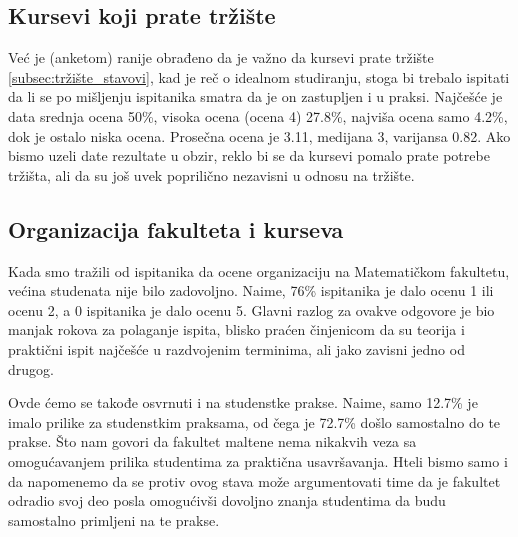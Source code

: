 \documentclass[a4paper]{article}
\begin{document}
{\subsection{Kursevi koji prate tržište}
\label{subsec:tržište_iskustva}

Već je (anketom) ranije obrađeno da je važno da kursevi prate tržište \ref{subsec:tržište_stavovi}, kad je reč o idealnom studiranju, stoga bi trebalo ispitati da li se po mišljenju ispitanika smatra da je on zastupljen i u praksi. Najčešće je data srednja ocena 50\%, visoka ocena (ocena 4) 27.8\%, najviša ocena samo 4.2\%, dok je ostalo niska ocena. Prosečna ocena je 3.11, medijana 3, varijansa 0.82. Ako bismo uzeli date rezultate u obzir, reklo bi se da kursevi pomalo prate potrebe tržišta, ali da su još uvek poprilično nezavisni u odnosu na tržište.

\subsection{Organizacija fakulteta i kurseva}
\label{subsec:organizacija_iskustva}

Kada smo tražili od ispitanika da ocene organizaciju na Matematičkom fakultetu, većina studenata nije bilo zadovoljno. Naime, 76\% ispitanika je dalo ocenu 1 ili ocenu 2, a 0 ispitanika je dalo ocenu 5. Glavni razlog za ovakve odgovore je bio manjak rokova za polaganje ispita, blisko praćen činjenicom da su teorija i praktični ispit najčešće u razdvojenim terminima, ali jako zavisni jedno od drugog.

Ovde ćemo se takođe osvrnuti i na studenstke prakse. Naime, samo 12.7\% je imalo prilike za studenstkim praksama, od čega je 72.7\% došlo samostalno do te prakse. Što nam govori da fakultet maltene nema nikakvih veza sa omogućavanjem prilika studentima za praktična usavršavanja. Hteli bismo samo i da napomenemo da se protiv ovog stava može argumentovati time da je fakultet odradio svoj deo posla omogućivši dovoljno znanja studentima da budu samostalno primljeni na te prakse.

}
\end{document}
